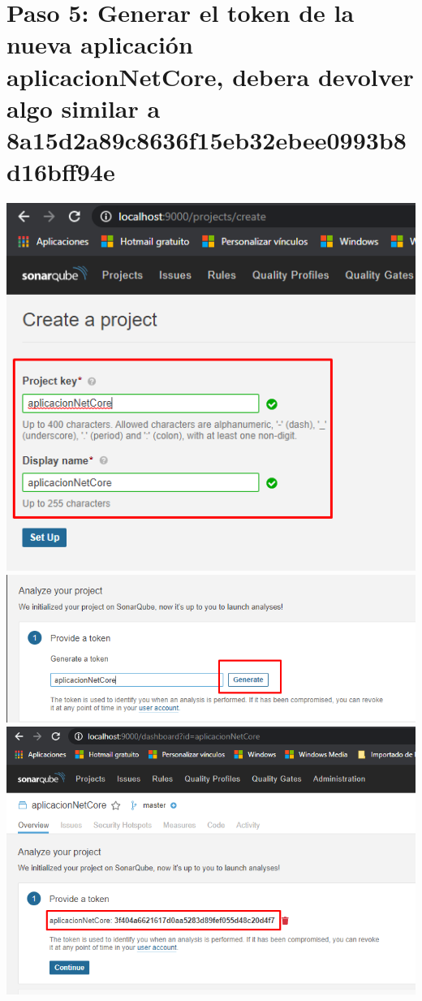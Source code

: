\section{Paso 5: Generar el token de la nueva aplicación aplicacionNetCore, debera devolver algo similar a 8a15d2a89c8636f15eb32ebee0993b8d16bff94e } 
\begin{center}
\includegraphics[width=\columnwidth]{images/5}\newline
\includegraphics[width=\columnwidth]{images/6}\newline
\includegraphics[width=\columnwidth]{images/7}\newline

\end{center}
